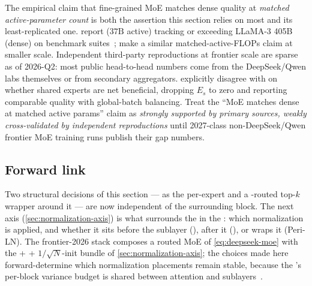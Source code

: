 \begin{contradiction}
The empirical claim that fine-grained MoE matches dense
quality at \emph{matched active-parameter count} is both the assertion
this section relies on most and its least-replicated one. \citet{deepseek-v3}
report  ($37\mathrm{B}$ active) tracking or exceeding
LLaMA-3 405B (dense) on benchmark
suites~\citep[abstract]{deepseek-v3}; \citet{deepseekmoe2024}
make a similar matched-active-FLOPs claim at smaller scale.
Independent third-party reproductions at frontier scale are sparse as
of 2026-Q2: most public head-to-head numbers come from the
DeepSeek/Qwen labs themselves or from secondary aggregators. \citet{qwen3}
explicitly disagree with \citet{deepseek-v3} on whether shared
experts are net beneficial, dropping $E_s$ to zero and reporting
comparable quality with global-batch balancing. Treat the
``MoE matches dense at matched active params'' claim as
\emph{strongly supported by primary sources, weakly cross-validated
by independent reproductions} until 2027-class non-DeepSeek/Qwen
frontier MoE training runs publish their gap numbers.
\end{contradiction}

\subsection{Forward link}
\label{sec:ffn-forward}

Two structural decisions of this section ---  as the per-expert
 and a -routed top-$k$ wrapper around it --- are now
independent of the surrounding block. The next axis
(\cref{sec:normalization-axis}) is what surrounds the  in the
: which normalization is applied, and whether it sits
before the sublayer (), after it (), or wraps it
(Peri-LN). The frontier-2026 stack composes a routed  MoE
of \cref{eq:deepseek-moe} with the  +  +
$1/\sqrt{N}$-init bundle of \cref{sec:normalization-axis}; the 
choices made here forward-determine which normalization placements
remain stable, because the 's per-block variance budget
is shared between attention and 
sublayers~\citep{xiong2020}.
